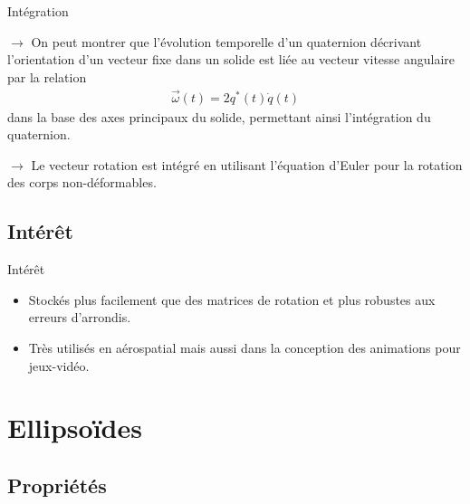\documentclass{beamer}
\begin{document}
\begin{frame}{Intégration}

$\rightarrow$ On peut montrer que l'évolution temporelle d'un quaternion décrivant l'orientation d'un vecteur fixe dans un solide est liée au vecteur vitesse angulaire par la relation
\begin{align*}
\vec{\omega}(t) = 2q^*(t)\dot{q}(t)
\end{align*}
dans la base des axes principaux du solide, permettant ainsi l'intégration du quaternion.\\
\vspace{10pt}

$\rightarrow$ Le vecteur rotation est intégré en utilisant l'équation d'Euler pour la rotation des corps non-déformables.

\end{frame}

\subsection{Intérêt}

\begin{frame}{Intérêt}

\begin{itemize}
    \item Stockés plus facilement que des matrices de rotation et plus robustes aux erreurs d'arrondis.
    \vspace{10pt}
    \item Très utilisés en aérospatial mais aussi dans la conception des animations pour jeux-vidéo.
\end{itemize}

\end{frame}

\section{Ellipsoïdes}

\subsection{Propriétés}
\end{document}
